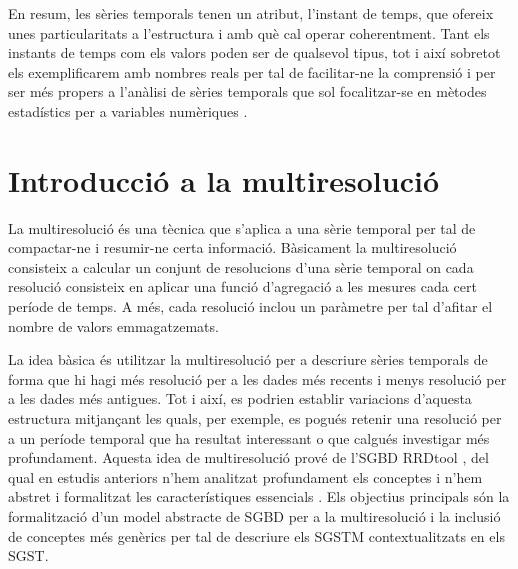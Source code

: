 En resum, les sèries temporals tenen un atribut, l'instant de temps,
que ofereix unes particularitats a l'estructura i amb què cal operar
coherentment. Tant els instants de temps com els valors poden ser de
qualsevol tipus, tot i així sobretot els exemplificarem amb nombres
reals per tal de facilitar-ne la comprensió i per ser més propers a
l'anàlisi de sèries temporals que sol focalitzar-se en mètodes
estadístics per a variables numèriques \parencite{last04:book}.








\section{Introducció a la multiresolució}

La multiresolució és una tècnica que s'aplica a una sèrie temporal
per tal de compactar-ne i resumir-ne certa informació.  Bàsicament la
multiresolució consisteix a calcular un conjunt de resolucions d'una
sèrie temporal on cada resolució consisteix en aplicar una funció
d'agregació a les mesures cada cert període de temps. A més, cada
resolució inclou un paràmetre per tal d'afitar el nombre de valors
emmagatzemats.  

La idea bàsica és utilitzar la multiresolució per a descriure sèries
temporals de forma que hi hagi més resolució per a les dades més
recents i menys resolució per a les dades més antigues. Tot i així, es
podrien establir variacions d'aquesta estructura mitjançant les quals,
per exemple, es pogués retenir una resolució per a un període temporal
que ha resultat interessant o que calgués investigar més profundament.
Aquesta idea de multiresolució prové de l'\gls{SGBD}
RRDtool \parencite{rrdtool}, del qual en estudis anteriors n'hem
analitzat profundament els conceptes i n'hem abstret i formalitzat les
característiques essencials \parencite{llusa11:tfm,llusa12:ptd}.  Els
objectius principals són la formalització d'un model abstracte de
\gls{SGBD} per a la multiresolució i la inclusió de conceptes més
genèrics per tal de descriure els \gls{SGSTM} contextualitzats en els
\gls{SGST}.

